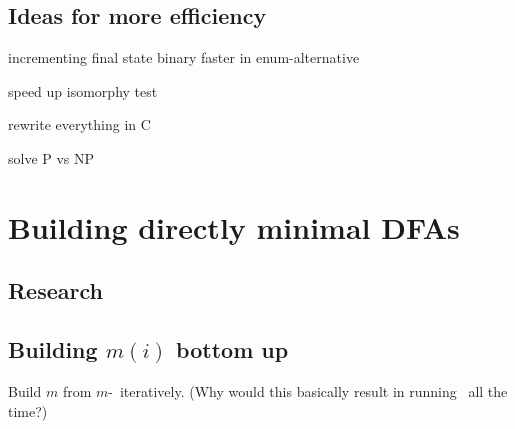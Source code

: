 \subsection{Ideas for more efficiency}

incrementing final state binary faster in enum-alternative

speed up isomorphy test

rewrite everything in C

solve P vs NP

\section{Building directly minimal DFAs}

\subsection{Research}

\subsection{Building $m(i)$ bottom up}

Build $m$ from $m$-\MinMark\ iteratively. (Why would this basically result in running \MinMark\ all the time?)
